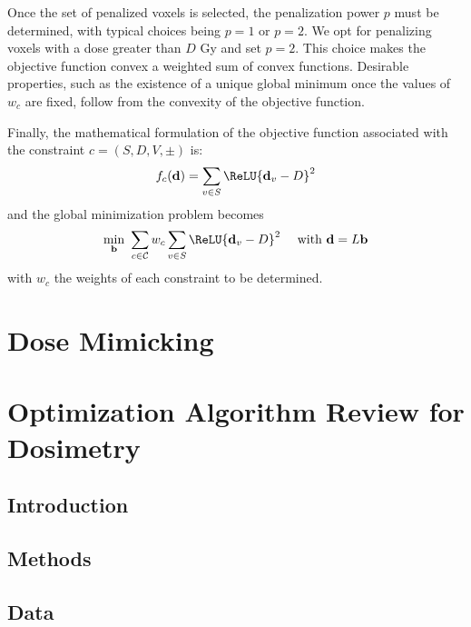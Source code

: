 Once the set of penalized voxels is selected, the penalization power $p$ must be determined, with typical choices being $p=1$ or $p=2$.
We opt for penalizing voxels with a dose greater than $D$ Gy and set $p=2$.
This choice makes the objective function convex a weighted sum of convex functions.
Desirable properties, such as the existence of a unique global minimum once the values of $w_c$ are fixed, follow from the convexity of the objective function.

Finally, the mathematical formulation of the objective function associated with the constraint $c = \left( S, D, V, \pm \right)$ is:
$$f_c(\mathbf{d}) = \sum_{v \in S} \ReLU{\mathbf{d}_v - D}^2$$
and the global minimization problem becomes
$$
\min_{\mathbf{b}} \ \sum_{c \in \mathcal{C}} w_c \sum_{v \in S} \ReLU{\mathbf{d}_v - D}^2
\quad \text{ with }
\mathbf{d} = L\mathbf{b}
$$
with $w_c$ the weights of each constraint to be determined.

\section{Dose Mimicking}

\section{Optimization Algorithm Review for Dosimetry}
\subsection{Introduction}

\subsection{Methods}

\subsection{Data}
